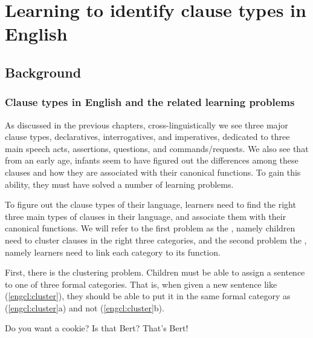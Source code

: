 \chapter{Learning to identify clause types in English}
\label{chap:eng-cl}

\section{Background}
\label{sec:engcl:background}

\subsection{Clause types in English and the related learning problems} \label{sec:engcl:bg:problems}

As discussed in the previous chapters, cross-linguistically we see three major clause types, declaratives, interrogatives, and imperatives, dedicated to three main speech acts, assertions, questions, and commands/requests. We also see that from an early age, infants seem to have figured out the differences among these clauses and how they are associated with their canonical functions. To gain this ability, they must have solved a number of learning problems. 

To figure out the clause types of their language, learners need to find the right three main types of clauses in their language, and associate them with their canonical functions. We will refer to the first problem as the , namely children need to cluster clauses in the right three categories, and the second problem the , namely learners need to link each category to its function. 


First, there is the clustering problem. Children must be able to assign a sentence to one of three formal categories. That is, when given a new sentence like (\ref{engcl:cluster}), they should be able to put it in the same formal category as (\ref{engcl:cluster}a) and not (\ref{engcl:cluster}b). 

Do you want a cookie?
\bxl{}
Is that Bert?
\ex
That’s Bert!
\exl
\eex

